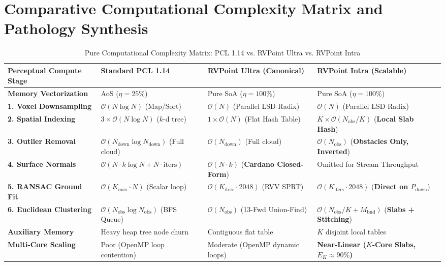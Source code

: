 \documentclass[11pt,a4paper]{article}
\begin{document}
\section{Comparative Computational Complexity Matrix and Pathology Synthesis}
\label{sec:complexity_table}

\begin{table}[ht]
\centering
\small
\renewcommand{\arraystretch}{1.25}
\caption{Pure Computational Complexity Matrix: PCL 1.14 vs. RVPoint Ultra vs. RVPoint Intra}
\label{tab:pure_math_complexity}
\begin{tabular}{@{}llll@{}}
\toprule
\textbf{Perceptual Compute Stage} & \textbf{Standard PCL 1.14} & \textbf{RVPoint Ultra (Canonical)} & \textbf{RVPoint Intra (Scalable)} \\ \midrule
\textbf{Memory Vectorization} & AoS ($\eta = 25\%$) & Pure SoA ($\eta = 100\%$) & Pure SoA ($\eta = 100\%$) \\
\textbf{1. Voxel Downsampling} & $\mathcal{O}(N \log N)$ (Map/Sort) & $\mathcal{O}(N)$ (Parallel LSD Radix) & $\mathcal{O}(N)$ (Parallel LSD Radix) \\
\textbf{2. Spatial Indexing} & $3 \times \mathcal{O}(N \log N)$ ($k$-d tree) & $1 \times \mathcal{O}(N)$ (Flat Hash Table) & $K \times \mathcal{O}(N_{\text{obs}}/K)$ (\textbf{Local Slab Hash}) \\
\textbf{3. Outlier Removal} & $\mathcal{O}(N_{\text{down}} \log N_{\text{down}})$ (Full cloud) & $\mathcal{O}(N_{\text{down}})$ (Full cloud) & $\mathcal{O}(N_{\text{obs}})$ (\textbf{Obstacles Only, Inverted}) \\
\textbf{4. Surface Normals} & $\mathcal{O}(N \cdot k \log N + N \cdot \text{iters})$ & $\mathcal{O}(N \cdot k)$ (\textbf{Cardano Closed-Form}) & Omitted for Stream Throughput \\
\textbf{5. RANSAC Ground Fit} & $\mathcal{O}(K_{\max} \cdot N)$ (Scalar loop) & $\mathcal{O}(K_{\text{iters}} \cdot 2048)$ (RVV SPRT) & $\mathcal{O}(K_{\text{iters}} \cdot 2048)$ (\textbf{Direct on $P_{\text{down}}$}) \\
\textbf{6. Euclidean Clustering} & $\mathcal{O}(N_{\text{obs}} \log N_{\text{obs}})$ (BFS Queue) & $\mathcal{O}(N_{\text{obs}})$ (13-Fwd Union-Find) & $\mathcal{O}(N_{\text{obs}}/K + M_{\text{bnd}})$ (\textbf{Slabs + Stitching}) \\
\textbf{Auxiliary Memory} & Heavy heap tree node churn & Contiguous flat table & $K$ disjoint local tables \\
\textbf{Multi-Core Scaling} & Poor (OpenMP loop contention) & Moderate (OpenMP dynamic loops) & \textbf{Near-Linear ($K$-Core Slabs, $E_K \approx 90\%$)} \\ \bottomrule
\end{tabular}
\end{table}
\end{document}
